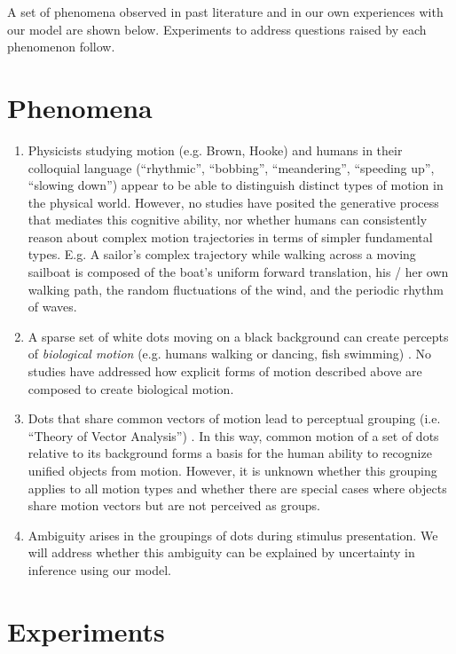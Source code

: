 \documentclass{scrartcl}
\begin{document}
A set of phenomena observed in past literature and in our own experiences with our model are shown below. Experiments to address questions raised by each phenomenon follow. 

\section{Phenomena}

\begin{enumerate}
  \item Physicists studying motion (e.g. Brown, Hooke) and humans in their colloquial language (``rhythmic'', ``bobbing'', ``meandering'', ``speeding up'', ``slowing down'') appear to be able to distinguish distinct types of motion in the physical world. However, no studies have posited the generative process that mediates this cognitive ability, nor whether humans can consistently reason about complex motion trajectories in terms of simpler fundamental types. E.g. A sailor's complex trajectory while walking across a moving sailboat is composed of the boat's uniform forward translation, his / her own walking path, the random fluctuations of the wind, and the periodic rhythm of waves. 
  \item A sparse set of white dots moving on a black background can create percepts of \emph{biological motion} (e.g. humans walking or dancing, fish swimming) \cite{Johansson_1973}. No studies have addressed how explicit forms of motion described above are composed to create biological motion. 
  \item Dots that share common vectors of motion lead to perceptual grouping (i.e. ``Theory of Vector Analysis'') \cite{Johansson_1973}. In this way, common motion of a set of dots relative to its background forms a basis for the human ability to recognize unified objects from motion. However, it is unknown whether this grouping applies to all motion types and whether there are special cases where objects share motion vectors but are not perceived as groups.
  \item Ambiguity arises in the groupings of dots during stimulus presentation. We will address whether this ambiguity can be explained by uncertainty in inference using our model. 
\end{enumerate}


\section*{Experiments}
\end{document}
